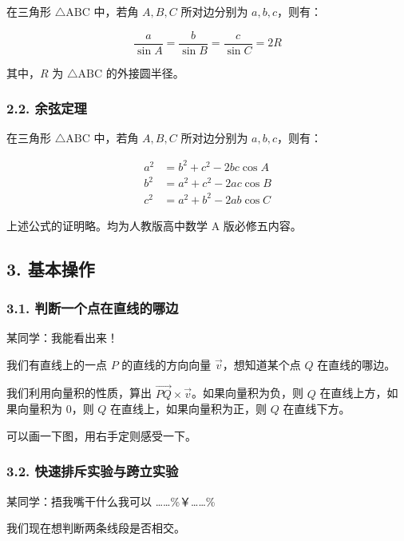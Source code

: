 在三角形 $\triangle \text{ABC}$ 中，若角 $A,B,C$ 所对边分别为 $a,b,c$，则有：

$$
\frac{a}{\sin A}=\frac{b}{\sin B}=\frac{c}{\sin C}=2R
$$

其中，$R$ 为 $\triangle \text{ABC}$ 的外接圆半径。

\subsubsection{2.2. 余弦定理}

在三角形 $\triangle \text{ABC}$ 中，若角 $A,B,C$ 所对边分别为 $a,b,c$，则有：

$$
\begin{aligned}
a^2&=b^2+c^2-2bc\cos A\\
b^2&=a^2+c^2-2ac\cos B\\
c^2&=a^2+b^2-2ab\cos C
\end{aligned}
$$

上述公式的证明略。均为人教版高中数学 A 版必修五内容。

\subsection{3. 基本操作}

\subsubsection{3.1. 判断一个点在直线的哪边}

\begin{QUOTE}{}{}
某同学：我能看出来！
\end{QUOTE}

我们有直线上的一点 $P$ 的直线的方向向量 $\vec v$，想知道某个点 $Q$ 在直线的哪边。

我们利用向量积的性质，算出 $\overrightarrow {PQ}\times \vec v$。如果向量积为负，则 $Q$ 在直线上方，如果向量积为 $0$，则 $Q$ 在直线上，如果向量积为正，则 $Q$ 在直线下方。

可以画一下图，用右手定则感受一下。

\subsubsection{3.2. 快速排斥实验与跨立实验}

\begin{QUOTE}{}{}
某同学：捂我嘴干什么我可以 ……\%￥……\%
\end{QUOTE}

我们现在想判断两条线段是否相交。

